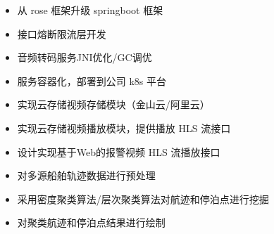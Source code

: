 \documentclass[10pt,a4paper]{altacv}
\begin{document}

\begin{itemize}
\item 从 rose 框架升级 springboot 框架
\item 接口熔断限流层开发
\item 音频转码服务JNI优化/GC调优
\item 服务容器化，部署到公司 k8s 平台
\end{itemize}

\divider


\begin{itemize}
\item 实现云存储视频存储模块（金山云/阿里云）
\item 实现云存储视频播放模块，提供播放 HLS 流接口
\item 设计实现基于Web的报警视频 HLS 流播放接口
\end{itemize}

\divider

\begin{itemize}
\item 对多源船舶轨迹数据进行预处理
\item 采用密度聚类算法/层次聚类算法对航迹和停泊点进行挖掘
\item 对聚类航迹和停泊点结果进行绘制
\end{itemize}



\end{document}
